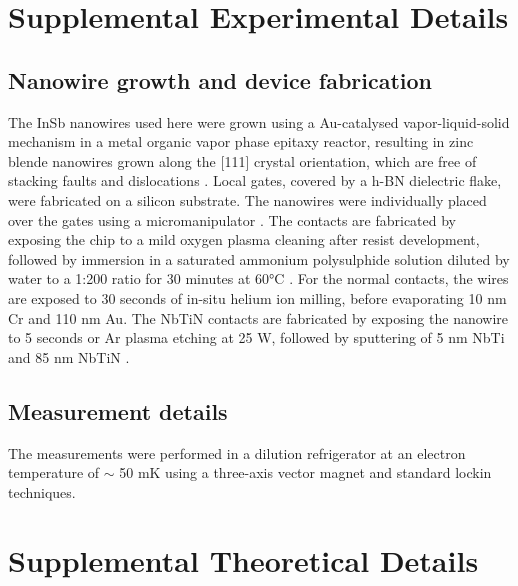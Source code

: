 \section{Supplemental Experimental Details}
\subsection{Nanowire growth and device fabrication}
The \mbox{InSb} nanowires used here were grown using a Au-catalysed vapor-liquid-solid mechanism in a metal organic vapor phase epitaxy reactor, resulting in zinc blende nanowires grown \mbox{along} the [111] crystal orientation, which are free of stacking \mbox{faults} and dislocations \cite{Car2014}. Local gates, covered by a h-BN dielectric flake, were fabricated on a silicon substrate. The nanowires were individually placed over the gates using a micromanipulator \cite{Flohr2011}. The contacts are fabricated by exposing the chip to a mild oxygen plasma cleaning after resist development, followed by immersion in a saturated ammonium polysulphide solution diluted by water to a 1:200 ratio for 30 minutes at \ang{60}C \cite{Suyatin2007}. For the normal contacts, the wires are exposed to 30 seconds of in-situ helium ion milling, before evaporating 10 nm Cr and 110 nm Au. The NbTiN contacts are fabricated by exposing the nanowire to 5 seconds or Ar plasma etching at 25 W, followed by sputtering of 5 nm NbTi and 85 nm NbTiN \cite{HardGap,BalSc}.

\subsection{Measurement details}
The measurements were performed in a dilution refrigerator at an electron temperature of $\sim$ 50 mK  using a three-axis vector magnet and standard lockin techniques.

\newpage
\section{Supplemental Theoretical Details}

